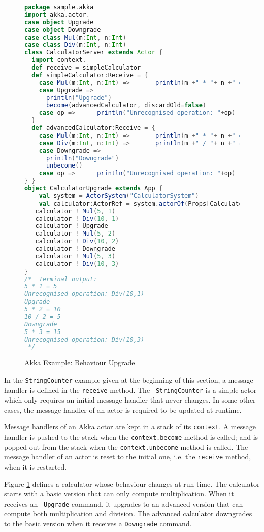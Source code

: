 \begin{figure}[p]
\begin{lstlisting}[language=scala]
package sample.akka
import akka.actor._
case object Upgrade
case object Downgrade
case class Mul(m:Int, n:Int) 
case class Div(m:Int, n:Int)
class CalculatorServer extends Actor { 
  import context._
  def receive = simpleCalculator
  def simpleCalculator:Receive = {
    case Mul(m:Int, n:Int) =>       println(m +" * "+ n +" = "+ (m*n))
    case Upgrade =>
      println("Upgrade")
      become(advancedCalculator, discardOld=false)
    case op =>      println("Unrecognised operation: "+op)
  }
  def advancedCalculator:Receive = {
    case Mul(m:Int, n:Int) =>       println(m +" * "+ n +" = "+ (m*n))
    case Div(m:Int, n:Int) =>       println(m +" / "+ n +" = "+ (m/n))
    case Downgrade =>
      println("Downgrade")
      unbecome()
    case op =>      println("Unrecognised operation: "+op)
} }  
object CalculatorUpgrade extends App {
    val system = ActorSystem("CalculatorSystem") 
    val calculator:ActorRef = system.actorOf(Props[CalculatorServer], "calculator")   
   calculator ! Mul(5, 1)
   calculator ! Div(10, 1)
   calculator ! Upgrade
   calculator ! Mul(5, 2)
   calculator ! Div(10, 2)
   calculator ! Downgrade
   calculator ! Mul(5, 3)
   calculator ! Div(10, 3)
}
/*  Terminal output:
5 * 1 = 5
Unrecognised operation: Div(10,1)
Upgrade
5 * 2 = 10
10 / 2 = 5
Downgrade
5 * 3 = 15
Unrecognised operation: Div(10,3)
 */
\end{lstlisting}
  \caption{Akka Example: Behaviour Upgrade}
  \label{fig:akka_swap} 
\end{figure}

In the {\tt StringCounter} example given at the beginning of this section, a 
message handler is defined in the {\tt receive} method.  The {\tt 
StringCounter} is a simple actor which only requires an initial message handler 
that never changes.  In some other cases, the message handler of an actor is 
required to be updated at runtime.

Message handlers of an Akka actor are kept in a stack of its {\tt context}.  A 
message handler is pushed to the stack when the {\tt context.become} method 
is called; and is popped out from the stack when the {\tt context.unbecome} 
method is called. The message handler of an actor is reset to the initial one, 
i.e. the {\tt receive} method, when it is restarted.

Figure  \ref{fig:akka_swap} defines a calculator whose behaviour changes at 
run-time.
The calculator starts with a basic 
version that can only compute multiplication.  When it receives an {\tt 
Upgrade} command, it upgrades to an advanced version that
can compute both multiplication and division.  The advanced calculator
downgrades to the basic version when it
receives a {\tt Downgrade} command.  

